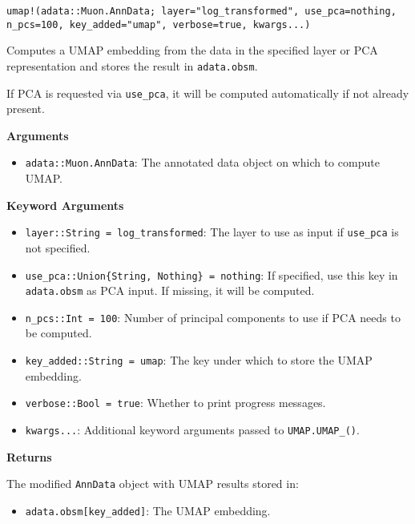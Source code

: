 \documentclass[oneside]{memoir}
\begin{document}
\begin{adjustwidth}{2em}{0pt}


\begin{verbatim}
umap!(adata::Muon.AnnData; layer="log_transformed", use_pca=nothing, n_pcs=100, key_added="umap", verbose=true, kwargs...)
\end{verbatim}

Computes a UMAP embedding from the data in the specified layer or PCA representation and stores the result in \texttt{adata.obsm}.

If PCA is requested via \texttt{use\_pca}, it will be computed automatically if not already present.

\textbf{Arguments}

\begin{itemize}
\item \texttt{adata::Muon.AnnData}: The annotated data object on which to compute UMAP.

\end{itemize}
\textbf{Keyword Arguments}

\begin{itemize}
\item \texttt{layer::String = {\textquotedbl}log\_transformed{\textquotedbl}}: The layer to use as input if \texttt{use\_pca} is not specified.


\item \texttt{use\_pca::Union\{String, Nothing\} = nothing}: If specified, use this key in \texttt{adata.obsm} as PCA input. If missing, it will be computed.


\item \texttt{n\_pcs::Int = 100}: Number of principal components to use if PCA needs to be computed.


\item \texttt{key\_added::String = {\textquotedbl}umap{\textquotedbl}}: The key under which to store the UMAP embedding.


\item \texttt{verbose::Bool = true}: Whether to print progress messages.


\item \texttt{kwargs...}: Additional keyword arguments passed to \texttt{UMAP.UMAP\_()}.

\end{itemize}
\textbf{Returns}

The modified \texttt{AnnData} object with UMAP results stored in:

\begin{itemize}
\item \texttt{adata.obsm[key\_added]}: The UMAP embedding.



\end{itemize}
\end{adjustwidth}
\end{document}
